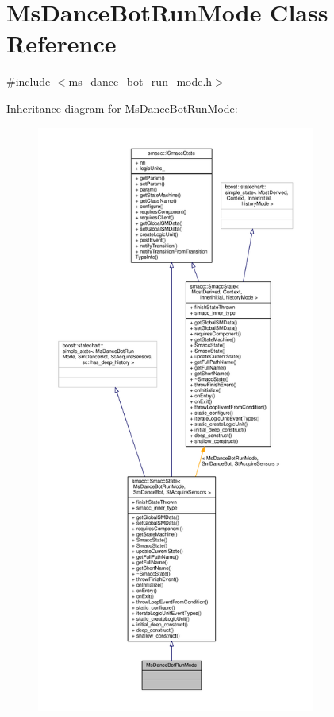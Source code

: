 \hypertarget{classMsDanceBotRunMode}{}\section{Ms\+Dance\+Bot\+Run\+Mode Class Reference}
\label{classMsDanceBotRunMode}


{\ttfamily \#include $<$ms\+\_\+dance\+\_\+bot\+\_\+run\+\_\+mode.\+h$>$}



Inheritance diagram for Ms\+Dance\+Bot\+Run\+Mode\+:
\nopagebreak
\begin{figure}[H]
\begin{center}
\leavevmode
\includegraphics[height=550pt]{classMsDanceBotRunMode__inherit__graph}
\end{center}
\end{figure}


